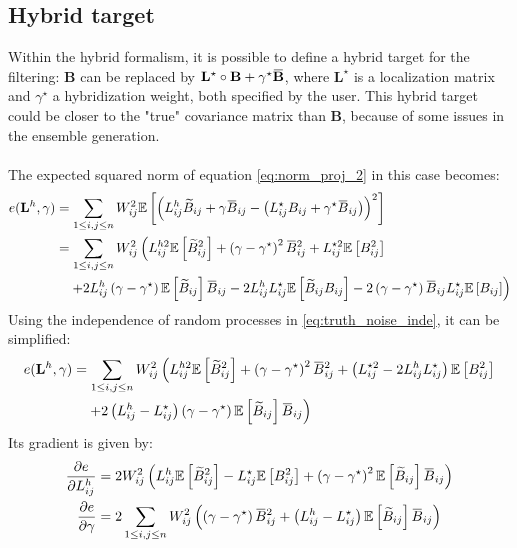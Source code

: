 \documentclass[12pt]{scrartcl}
\newcommand{\overbar}[1]{\mkern 1.5mu\overline{\mkern-1.5mu#1\mkern-1.5mu}\mkern 1.5mu}
\begin{document}
\subsection{Hybrid target}
Within the hybrid formalism, it is possible to define a hybrid target for the filtering: $\mathbf{B}$ can be replaced by $\mathbf{L}^\star \circ \mathbf{B} + \gamma^\star \overbar{\mathbf{B}}$, where $\mathbf{L}^\star$ is a localization matrix and $\gamma^\star$ a hybridization weight, both specified by the user. This hybrid target could be closer to the "true" covariance matrix than $\mathbf{B}$, because of some issues in the ensemble generation.\\
$  $\\
The expected squared norm of equation \eqref{eq:norm_proj_2} in this case becomes:
\begin{align}
e(\mathbf{L}^h,\gamma) & = \sum_{1 \le i,j \le n} W_{ij}^2 \mathbb{E}\left[ \left(L^h_{ij} \widetilde{B}_{ij} + \gamma \overbar{B}_{ij} - \left(L_{ij}^\star B_{ij} + \gamma^\star \overbar{B}_{ij}\right) \right)^2 \right] \nonumber \\
& = \sum_{1 \le i,j \le n} W_{ij}^2 \left(L^{h2}_{ij} \mathbb{E} \left[\widetilde{B}_{ij}^2\right] + \left(\gamma - \gamma^\star \right)^2 \overbar{B}_{ij}^2 + L_{ij}^{\star2} \mathbb{E} \left[B^2_{ij}\right] \right. \nonumber \\
& \left. \quad + 2 L^h_{ij} \left(\gamma - \gamma^\star \right) \mathbb{E} \left[\widetilde{B}_{ij}\right] \overbar{B}_{ij} - 2 L^h_{ij} L_{ij}^\star \mathbb{E} \left[\widetilde{B}_{ij} B_{ij}\right] - 2 \left(\gamma - \gamma^\star \right) \overbar{B}_{ij} L_{ij}^\star \mathbb{E} \left[B_{ij}\right] \right)
\end{align}
Using the independence of random processes in \eqref{eq:truth_noise_inde}, it can be simplified:
\begin{align}
e(\mathbf{L}^h,\gamma) & = \sum_{1 \le i,j \le n} W_{ij}^2 \left(L^{h2}_{ij} \mathbb{E} \left[\widetilde{B}_{ij}^2\right] + \left(\gamma - \gamma^\star \right)^2 \overbar{B}_{ij}^2 + \left(L_{ij}^{\star2} - 2 L^h_{ij} L_{ij}^\star \right) \mathbb{E} \left[B^2_{ij}\right] \right. \nonumber \\
& \left. \quad + 2 \left(L^h_{ij} - L_{ij}^\star\right) \left(\gamma - \gamma^\star \right) \mathbb{E} \left[\widetilde{B}_{ij}\right] \overbar{B}_{ij} \right)
\end{align}
Its gradient is given by:
\begin{subequations}
\begin{align}
\frac{\partial e}{\partial L^h_{ij}} & = 2 W_{ij}^2 \left(L^h_{ij} \mathbb{E} \left[\widetilde{B}_{ij}^2\right] - L_{ij}^\star \mathbb{E} \left[B^2_{ij}\right] + \left(\gamma - \gamma^\star \right)^2 \mathbb{E} \left[\widetilde{B}_{ij}\right] \overbar{B}_{ij} \right) \\
\frac{\partial e}{\partial \gamma} & = 2 \sum_{1 \le i,j \le n} W_{ij}^2 \left(\left(\gamma - \gamma^\star \right) \overbar{B}_{ij}^2 + \left(L^h_{ij} - L_{ij}^\star\right) \mathbb{E} \left[\widetilde{B}_{ij}\right] \overbar{B}_{ij} \right)
\end{align}
\end{subequations}
\end{document}

